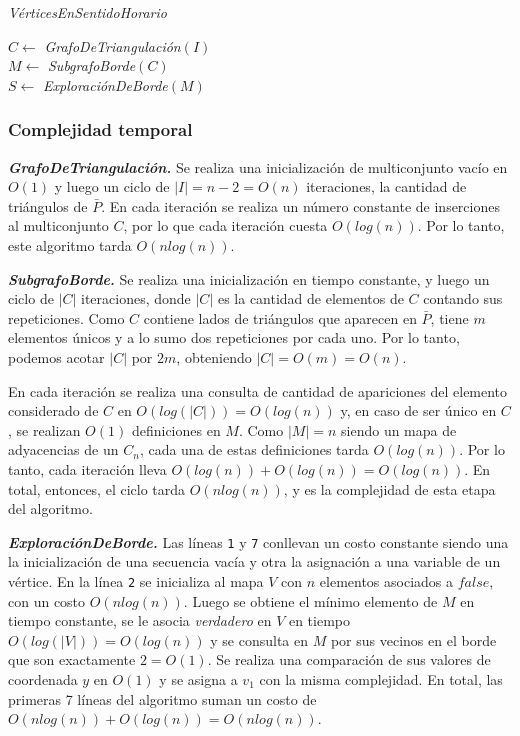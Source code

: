 \bigskip 

\begin{algorithm}[H]
	\caption{\textit{VérticesEnSentidoHorario}}

	$C \gets$ \textit{GrafoDeTriangulación}$(I)$ \\
	$M \gets$ \textit{SubgrafoBorde}$(C)$ \\
	$S \gets$ \textit{ExploraciónDeBorde}$(M)$ \\
	
\end{algorithm}

\subsubsection{Complejidad temporal}

\textit{\textbf{GrafoDeTriangulación.}} Se realiza una inicialización de multiconjunto vacío en $O(1)$ y luego un ciclo de $|I| = n-2 = O(n)$ iteraciones, la cantidad de triángulos de $\bar{P}$. En cada iteración se realiza un número constante de inserciones al multiconjunto $C$, por lo que cada iteración cuesta $O(log(n))$. Por lo tanto, este algoritmo tarda $O(n log(n))$.

\medskip

\textit{\textbf{SubgrafoBorde.}} Se realiza una inicialización en tiempo constante, y luego un ciclo de $|C|$ iteraciones, donde $|C|$ es la cantidad de elementos de $C$ contando sus repeticiones. Como $C$ contiene lados de triángulos que aparecen en $\bar{P}$, tiene $m$ elementos únicos y a lo sumo dos repeticiones por cada uno. Por lo tanto, podemos acotar $|C|$ por $2m$, obteniendo $|C| = O(m) = O(n)$.

En cada iteración se realiza una consulta de cantidad de apariciones del elemento considerado de $C$ en $O(log(|C|)) = O(log(n))$ y, en caso de ser único en $C$, se realizan $O(1)$ definiciones en $M$. Como $|M| = n$ siendo un mapa de adyacencias de un $C_n$, cada una de estas definiciones tarda $O(log(n))$. Por lo tanto, cada iteración lleva $O(log(n)) + O(log(n)) = O(log(n))$. En total, entonces, el ciclo tarda $O(n log(n))$, y es la complejidad de esta etapa del algoritmo.

\medskip

\textit{\textbf{ExploraciónDeBorde.}} Las líneas \texttt{1} y \texttt{7} conllevan un costo constante siendo una la inicialización de una secuencia vacía y otra la asignación a una variable de un vértice. En la línea \texttt{2} se inicializa al mapa $V$ con $n$ elementos asociados a $false$, con un costo $O(n log (n))$. Luego se obtiene el mínimo elemento de $M$ en tiempo constante, se le asocia \textit{verdadero} en $V$ en tiempo $O(log(|V|)) = O(log(n))$ y se consulta en $M$ por sus vecinos en el borde que son exactamente $2 = O(1)$. Se realiza una comparación de sus valores de coordenada $y$ en $O(1)$ y se asigna a $v_1$ con la misma complejidad. En total, las primeras 7 líneas del algoritmo suman un costo de $O(n log(n)) + O(log(n)) = O(n log(n))$.

